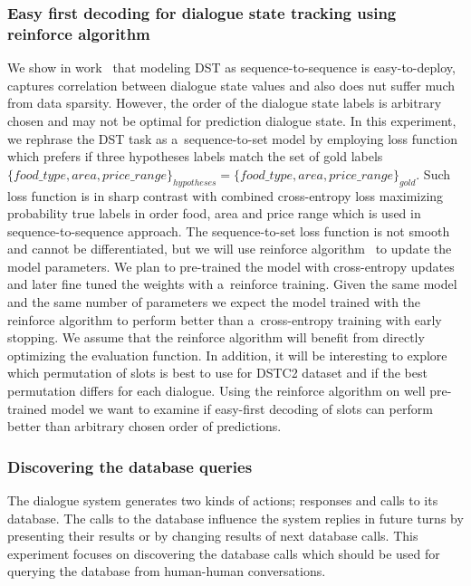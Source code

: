 \documentclass[11pt]{article}
\begin{document}
\subsubsection*{Easy first decoding for dialogue state tracking using reinforce algorithm}
We show in work~\cite{platek_recurrent_2016} that modeling DST as sequence-to-sequence is easy-to-deploy, captures correlation between dialogue state values and also does nut suffer much from data sparsity.
However, the order of the dialogue state labels is arbitrary chosen and may not be optimal for prediction dialogue state.
In this experiment, we rephrase the DST task as a~sequence-to-set model by employing loss function which prefers if three hypotheses labels match the set of gold labels $\{food\_type, area, price\_range\}_{hypotheses} = \{food\_type, area, price\_range\}_{gold}$.
Such loss function is in sharp contrast with combined cross-entropy loss maximizing probability true labels in order food, area and price range which is used in sequence-to-sequence approach.
The sequence-to-set loss function is not smooth and cannot be differentiated, but we will use reinforce algorithm~\cite{williams_simple_1992} to update the model parameters.
We plan to pre-trained the model with cross-entropy updates and later fine tuned the weights with a~reinforce training.
Given the same model and the same number of parameters we expect the model trained with the reinforce algorithm to perform better than a~cross-entropy training with early stopping.
We assume that the reinforce algorithm will benefit from directly optimizing the evaluation function.
In addition, it will be interesting to explore which permutation of slots is best to use for DSTC2 dataset and if the best permutation differs for each dialogue.
Using the reinforce algorithm on well pre-trained model we want to examine if easy-first decoding of slots can perform better than arbitrary chosen order of predictions. 

\subsubsection*{Discovering the database queries}
The dialogue system generates two kinds of actions; responses and calls to its database.
The calls to the database influence the system replies in future turns by presenting their results or by changing results of next database calls.
This experiment focuses on discovering the database calls which should be used for querying the database from human-human conversations.
\end{document}
